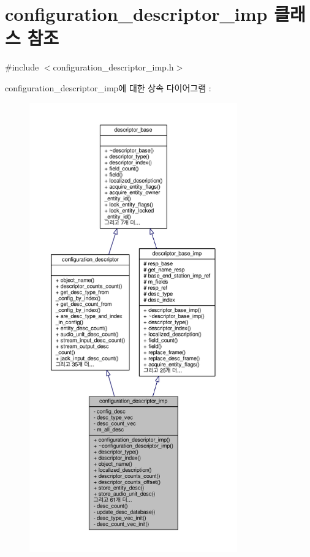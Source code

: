 \hypertarget{classavdecc__lib_1_1configuration__descriptor__imp}{}\section{configuration\+\_\+descriptor\+\_\+imp 클래스 참조}
\label{classavdecc__lib_1_1configuration__descriptor__imp}


{\ttfamily \#include $<$configuration\+\_\+descriptor\+\_\+imp.\+h$>$}



configuration\+\_\+descriptor\+\_\+imp에 대한 상속 다이어그램 \+: 
\nopagebreak
\begin{figure}[H]
\begin{center}
\leavevmode
\includegraphics[height=550pt]{classavdecc__lib_1_1configuration__descriptor__imp__inherit__graph}
\end{center}
\end{figure}


